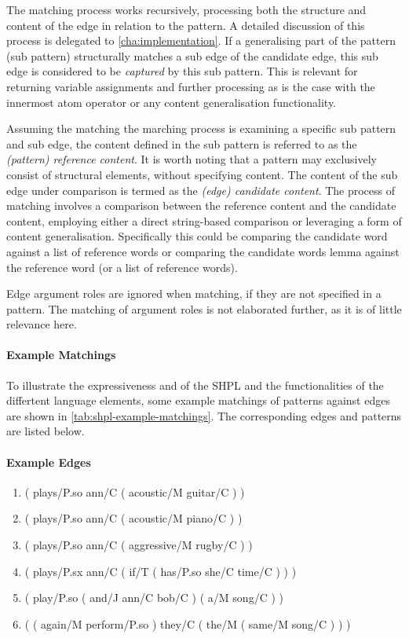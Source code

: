 \documentclass[11pt]{scrreprt}
\begin{document}
The matching process works recursively, processing both the structure and content of the edge in relation to the pattern. A detailed discussion of this process is delegated to \cref{cha:implementation}. If a generalising part of the pattern (sub pattern) structurally matches a sub edge of the candidate edge, this sub edge is considered to be \textit{captured} by this sub pattern. This is relevant for returning variable assignments and further processing as is the case with the innermost atom operator or any content generalisation functionality.

Assuming the matching the marching process is examining a specific sub pattern and sub edge, the content defined in the sub pattern is referred to as the \textit{(pattern) reference content}. It is worth noting that a pattern may exclusively consist of structural elements, without specifying content. The content of the sub edge under comparison is termed as the \textit{(edge) candidate content}. The process of matching involves a comparison between the reference content and the candidate content, employing either a direct string-based comparison or leveraging a form of content generalisation. Specifically this could be comparing the candidate word against a list of reference words or comparing the candidate words lemma against the reference word (or a list of reference words).

Edge argument roles are ignored when matching, if they are not specified in a pattern. The matching of argument roles is not elaborated further, as it is of little relevance here.


\paragraph{Example Matchings} To illustrate the expressiveness and of the SHPL and the
functionalities of the differtent language elements, some example matchings of patterns against edges are shown in \cref{tab:shpl-example-matchings}. The corresponding edges and patterns are listed below.

\paragraph{Example Edges}
\begin{enumerate}[label={$e_{\arabic*}$ = }]
	\item \textsf{( plays/P.so ann/C ( acoustic/M guitar/C ) )}
	\item \textsf{( plays/P.so ann/C ( acoustic/M piano/C ) )}
	\item \textsf{( plays/P.so ann/C ( aggressive/M rugby/C ) )}
	\item \textsf{( plays/P.sx ann/C ( if/T ( has/P.so she/C time/C ) ) )}
	\item \textsf{( play/P.so ( and/J ann/C bob/C ) ( a/M song/C ) )}
	\item \textsf{( ( again/M perform/P.so ) they/C ( the/M ( same/M song/C ) ) )}
\end{enumerate}
\end{document}
